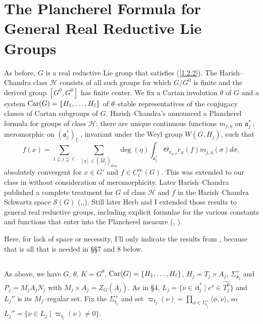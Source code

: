 \documentclass{conm-p-l}
\def\ga{\mathfrak{a}}
\def\gt{\mathfrak{t}}
\def\Car{{\rm Car}}
\def\C{\mathbb{C}}
\def\cH{\mathcal{H}}
\def\cS{\mathcal{S}}
\begin{document}
\section{The Plancherel Formula for General Real Reductive Lie Groups}
\label{sec5}
\setcounter{equation}{0}
As before, $G$ is a real reductive Lie group that satisfies (\ref{1.2.2}).
The Harish--Chandra class $\cH$ consists of all such groups for which 
$G/G^0$ is finite and the derived group $[G^0,G^0]$ has finite center.
We fix a Cartan involution $\theta$ of $G$ and a system
$\Car(G) = \{H_1, \dots , H_\ell\}$ of $\theta$--stable representatives of
the conjugacy classes of Cartan subgroups of $G$.  
Harish--Chandra's announced \cite[\S 11]{HC1971} a Plancherel formula
for groups of class $\cH$: there are unique continuous
functions $m_{j,\eta}$ on $\ga_j^*$\,, meromorphic on $(\ga_j^*)_\C$\,,
invariant under the Weyl group $W(G,H_j)$, such that
$$
f(x) = \sum_{1\leqq j\leqq\ell} \,\,\sum_{[\eta] \in (\widehat{M_j})_{disc}}
	\deg(\eta)\int_{\ga_j^*} \Theta_{\pi_{\eta,\sigma}}
	r_x(f) m_{j,\eta}(\sigma)d\sigma,
$$
absolutely convergent for $x \in G'$ and $f \in C_c^\infty(G).$ 
This was extended to our class in \cite{W1973} without consideration
of meromorphicity.  Later Harish--Chandra published a complete
treatment for $G$ of class $\cH$ and $f$ in the Harish--Chandra
Schwartz space $\cS(G)$ (\cite{HC1975},\cite{HC1976a},\cite{HC1976b}).  
Still later
Herb and I extended those results to general real reductive groups,
including explicit formulae for the various constants and functions 
that enter into the Plancherel measure (\cite{HW1986a}, \cite{HW1986b}).

Here, for lack of space or necessity, I'll only indicate the results from 
\cite{W1973}, because that is all that is needed in \S\S 7 and 8 below.

\subsection{}\label{ssec5a}\setcounter{equation}{0}
As above, we have $G$, $\theta$, $K = G^\theta$, 
$\Car(G) = \{H_1,\dots, H_\ell\}$, $H_j = T_j\times A_j$,
$\Sigma^+_{\ga_j}$ and $P_j = M_jA_jN_j$ with $M_j\times A_j = Z_G(A_j)$.
As in \S 4, $L_j = \{\nu \in i\gt^*_j \mid e^\nu \in \widehat{T_j^0}\}$
and $L_j''$ is its $M_j$--regular set.  Fix the $\Sigma^+_{\gt_j}$
and set $\varpi_{\gt_j}(\nu) = \prod_{\phi\in\Sigma^+_{\gt_j}}
\langle \phi,\nu\rangle$, so $L_j'' = \{\nu\in L_j \mid \varpi_{\gt_j}(\nu)
\ne 0\}$.  
\end{document}
